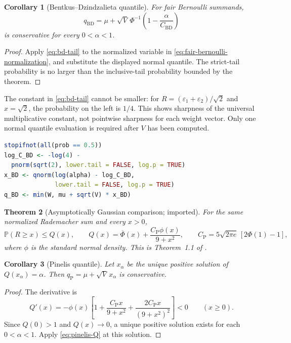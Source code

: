 \documentclass[11pt,letterpaper]{article}
\numberwithin{equation}{section}
\newtheorem{theorem}{Theorem}[section]
\newtheorem{corollary}[theorem]{Corollary}
\theoremstyle{definition}
\theoremstyle{remark}
\begin{document}
\begin{corollary}[Bentkus--Dzindzalieta quantile]
\label{cor:bd-quantile}
For fair Bernoulli summands,
\begin{equation}
  q_{\mathrm{BD}}=
    \mu+\sqrt V\,\Phi^{-1}\left(1-\frac\alpha{C_{\mathrm{BD}}}\right)
  \label{eq:bd-quantile}
\end{equation}
is conservative for every $0<\alpha<1$.
\end{corollary}
\begin{proof}
Apply \eqref{eq:bd-tail} to the normalized variable in
\eqref{eq:fair-bernoulli-normalization}, and substitute the displayed normal
quantile. The strict-tail probability is no larger than the inclusive-tail
probability bounded by the theorem.
\end{proof}

The constant in \eqref{eq:bd-tail} cannot be smaller: for
$R=(\varepsilon_1+\varepsilon_2)/\sqrt2$ and $x=\sqrt2$, the probability on
the left is $1/4$. This shows sharpness of the universal multiplicative
constant, not pointwise sharpness for each weight vector. Only one normal
quantile evaluation is required after $V$ has been computed.
\begin{lstlisting}[language=R]
stopifnot(all(prob == 0.5))
log_C_BD <- -log(4) -
  pnorm(sqrt(2), lower.tail = FALSE, log.p = TRUE)
x_BD <- qnorm(log(alpha) - log_C_BD,
              lower.tail = FALSE, log.p = TRUE)
q_BD <- min(W, mu + sqrt(V) * x_BD)
\end{lstlisting}

\begin{theorem}[Asymptotically Gaussian comparison; imported]
\label{thm:pinelis-Q}
For the same normalized Rademacher sum and every $x>0$,
\begin{equation}
  \mathbb{P}(R\ge x)\le Q(x),\qquad
  Q(x)=\overline\Phi(x)+\frac{C_{\mathrm P}\phi(x)}{9+x^2},\qquad
  C_{\mathrm P}=5\sqrt{2\pi e}\,[2\Phi(1)-1],
  \label{eq:pinelis-Q}
\end{equation}
where $\phi$ is the standard normal density. This is Theorem~1.1 of
\cite{pinelis2012}.
\end{theorem}

\begin{corollary}[Pinelis quantile]
\label{cor:pinelis-quantile}
Let $x_\alpha$ be the unique positive solution of $Q(x_\alpha)=\alpha$.
Then $q_{\mathrm P}=\mu+\sqrt V\,x_\alpha$ is conservative.
\end{corollary}
\begin{proof}
The derivative is
\[
  Q'(x)=-\phi(x)\left[
    1+\frac{C_{\mathrm P}x}{9+x^2}
      +\frac{2C_{\mathrm P}x}{(9+x^2)^2}\right]<0
  \qquad(x\ge0).
\]
Since $Q(0)>1$ and $Q(x)\to0$, a unique positive solution exists for each
$0<\alpha<1$. Apply \eqref{eq:pinelis-Q} at this solution.
\end{proof}
\end{document}
